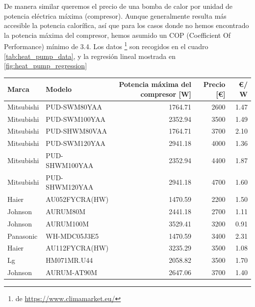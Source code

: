 De manera similar queremos el precio de una bomba de calor por unidad de
potencia eléctrica máxima (compresor). Aunque generalmente resulta más
accesible la potencia calorífica, así que para los casos donde no hemos
encontrado la potencia máxima del compresor, hemos asumido un COP (Coefficient
Of Performance) mínimo de 3.4. Los datos \footnote{de
	\url{https://www.climamarket.eu/}} son recogidos en el cuadro
\ref{tab:heat_pump_data}, y la regresión lineal mostrada en
\ref{fig:heat_pump_regression}

\begin{table}[htbp]
	\centering
	\begin{tabular}{llrrr}
		\toprule
		Marca      & Modelo         & Potencia máxima del compresor [W] & Precio [\euro] & \euro / W \\
		\midrule
		Mitsubishi & PUD-SWM80YAA   & 1764.71                           & 2600           & 1.47      \\
		Mitsubishi & PUD-SWM100YAA  & 2352.94                           & 3500           & 1.49      \\
		Mitsubishi & PUD-SHWM80VAA  & 1764.71                           & 3700           & 2.10      \\
		Mitsubishi & PUD-SWM120YAA  & 2941.18                           & 4000           & 1.36      \\
		Mitsubishi & PUD-SHWM100YAA & 2352.94                           & 4400           & 1.87      \\
		Mitsubishi & PUD-SHWM120YAA & 2941.18                           & 4700           & 1.60      \\
		Haier      & AU052FYCRA(HW) & 1470.59                           & 2200           & 1.50      \\
		Johnson    & AURUM80M       & 2441.18                           & 2700           & 1.11      \\
		Johnson    & AURUM100M      & 3529.41                           & 3200           & 0.91      \\
		Panasonic  & WH-MDC05J3E5   & 1470.59                           & 3400           & 2.31      \\
		Haier      & AU112FYCRA(HW) & 3235.29                           & 3500           & 1.08      \\
		Lg         & HM071MR.U44    & 2058.82                           & 3500           & 1.70      \\
		Johnson    & AURUM-AT90M    & 2647.06                           & 3700           & 1.40      \\

\end{tabular}
\end{table}
